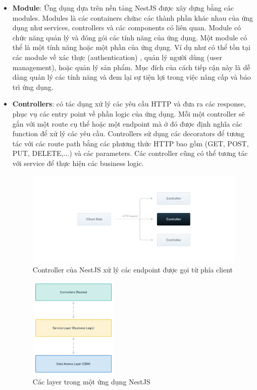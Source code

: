 \begin{itemize}
    \item \textbf{Module}: Ứng dụng dựa trên nền tảng NestJS được xây dựng bằng các modules. Modules là các containers chứac các thành phần khác nhau của ứng dụng như services, controllers và các components có liên quan. Module có chức năng quản lý và đóng gói các tính năng của ứng dụng. Một module có thể là một tính năng hoặc một phần của ứng dụng. Ví dụ như có thể tồn tại các module về xác thực (authentication) , quản lý người dùng (user management), hoặc quản lý sản phẩm. Mục đích của cách tiếp cận này là dễ dàng quản lý các tính năng và đem lại sự tiện lợi trong việc nâng cấp và bảo trì ứng dụng.

    \item \textbf{Controllers}: có tác dụng xử lý các yêu cầu HTTP và đưa ra các response, phục vụ các entry point về phần logic của ứng dụng. Mỗi một controller sẽ gắn với một route cụ thể hoặc một endpoint mà ở đó được định nghĩa các function để xử lý các yêu cầu. Controllers sử dụng các decorators để tương tác với các route path bằng các phương thức HTTP bao gồm (GET, POST, PUT, DELETE,...) và các parameters. Các controller cũng có thể tương tác với service để thực hiện các business logic.
    \begin{figure}[H]
        \centering
        \includegraphics[width=1\textwidth]{Images/technology/controller_2.png}
        \caption{Controller của NestJS xử lý các endpoint được gọi từ phía client}
    \end{figure}
    \begin{figure}[H]
        \centering
        \includegraphics[width=0.4\textwidth]{Images/technology/controller.png}
        \caption{Các layer trong một ứng dụng NestJS}
    \end{figure}
    

\end{itemize}
